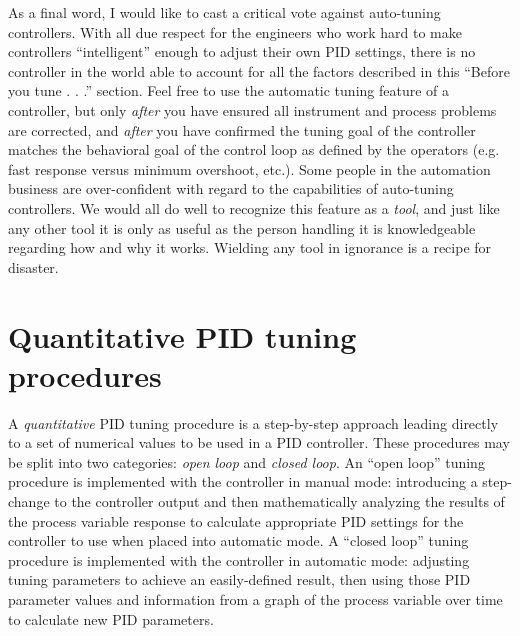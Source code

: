 \vskip 10pt

As a final word, I would like to cast a critical vote against auto-tuning controllers.  With all due respect for the engineers who work hard to make controllers ``intelligent'' enough to adjust their own PID settings, there is no controller in the world able to account for all the factors described in this ``Before you tune . . .'' section.  Feel free to use the automatic tuning feature of a controller, but only \textit{after} you have ensured all instrument and process problems are corrected, and \textit{after} you have confirmed the tuning goal of the controller matches the behavioral goal of the control loop as defined by the operators (e.g. fast response versus minimum overshoot, etc.).  Some people in the automation business are over-confident with regard to the capabilities of auto-tuning controllers.  We would all do well to recognize this feature as a \textit{tool}, and just like any other tool it is only as useful as the person handling it is knowledgeable regarding how and why it works.  Wielding any tool in ignorance is a recipe for disaster.  











\filbreak
\section{Quantitative PID tuning procedures}

\label{quantitative_pid_tuning}

A \textit{quantitative} PID tuning procedure is a step-by-step approach leading directly to a set of numerical values to be used in a PID controller.  These procedures may be split into two categories: \textit{open loop} and \textit{closed loop}.  An ``open loop'' tuning procedure is implemented with the controller in manual mode: introducing a step-change to the controller output and then mathematically analyzing the results of the process variable response to calculate appropriate PID settings for the controller to use when placed into automatic mode.  A ``closed loop'' tuning procedure is implemented with the controller in automatic mode: adjusting tuning parameters to achieve an easily-defined result, then using those PID parameter values and information from a graph of the process variable over time to calculate new PID parameters.

